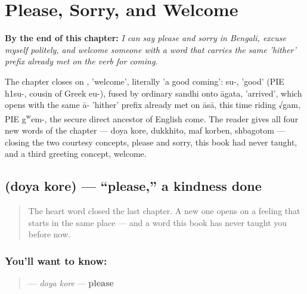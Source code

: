 
\chapter{Please, Sorry, and Welcome}
\label{ch:bn-please-sorry-welcome}

\begin{chapteropening}
\textbf{By the end of this chapter:} \emph{I can say please and sorry in Bengali, excuse myself politely, and welcome someone with a word that carries the same 'hither' prefix already met on the verb for coming.}

The chapter closes on , 'welcome', literally 'a good coming': su-, 'good' (PIE h1su-, cousin of Greek eu-), fused by ordinary sandhi onto āgata, 'arrived', which opens with the same ā- 'hither' prefix already met on āsā, this time riding √gam, PIE g\textsuperscript{w}em-, the secure direct ancestor of English come. The reader gives all four new words of the chapter — doya kore, dukkhito, maf korben, shbagotom — closing the two courtesy concepts, please and sorry, this book had never taught, and a third greeting concept, welcome.
\end{chapteropening}

\section[doya kore]{  (doya kore) — \textquotedblleft{}please,\textquotedblright{} a kindness done}

\label{lesson:BN-C13-doya-kore}



\begin{quote}
The heart word closed the last chapter. A new one opens on a feeling that starts in the same place — and a word this book has never taught you before now.
\end{quote}

\subsection*{You'll want to know:  }
\begin{quote}
\textbf{ } — \emph{doya kore} — \textbf{please}
\end{quote}

